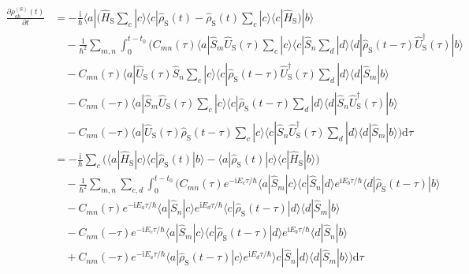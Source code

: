 \documentclass[9pt]{report}
\begin{document}
\begin{align}
\frac{\partial\rho_{ab}^{(\mathrm{S})}(t)}{\partial t} &= -\frac{\mathrm{i}}{\hbar}\langle a|\Big(\hat{H}_{\mathrm{S}}\sum_{c}|c\rangle\langle c|\hat{\rho}_{\mathrm{S}}(t)-\hat{\rho}_{\mathrm{S}}(t)\sum_{c}|c\rangle\langle c|\hat{H}_{\mathrm{S}}\Big)|b\rangle\\
&\quad-\frac{1}{\hbar^2}\sum_{m,n}\int_{0}^{t-t_0}\Big(C_{mn}(\tau)\langle a|\hat{S}_{m}\hat{U}_{\mathrm{S}}(\tau)\sum_{c}|c\rangle\langle c|\hat{S}_{n}\sum_{d}|d\rangle\langle d|\hat{\rho}_{\mathrm{S}}(t-\tau)\hat{U}_{\mathrm{S}}^{\dagger}(\tau)|b\rangle\\
&\quad-C_{mn}(\tau)\langle a|\hat{U}_{\mathrm{S}}(\tau)\hat{S}_{n}\sum_{c}|c\rangle\langle c|\hat{\rho}_{\mathrm{S}}(t-\tau)\hat{U}_{\mathrm{S}}^{\dagger}(\tau)\sum_{d}|d\rangle\langle d|\hat{S}_{m}|b\rangle\\
&\quad-C_{nm}(-\tau)\langle a|\hat{S}_{m}\hat{U}_{\mathrm{S}}(\tau)\sum_{c}|c\rangle\langle c|\hat{\rho}_{\mathrm{S}}(t-\tau)\sum_{d}|d\rangle\langle d|\hat{S}_{n}\hat{U}_{\mathrm{S}}^{\dagger}(\tau)|b\rangle\\
&\quad-C_{nm}(-\tau)\langle a|\hat{U}_{\mathrm{S}}(\tau)\hat{\rho}_{\mathrm{S}}(t-\tau)\sum_{c}|c\rangle\langle c|\hat{S}_{n}\hat{U}_{\mathrm{S}}^{\dagger}(\tau)\sum_{d}|d\rangle\langle d|\hat{S}_{m}|b\rangle\Big)\mathrm{d}\tau\\
&= -\frac{\mathrm{i}}{\hbar}\sum_{c}\Big(\langle a|\hat{H}_{\mathrm{S}}|c\rangle\langle c|\hat{\rho}_{\mathrm{S}}(t)|b\rangle - \langle a|\hat{\rho}_{\mathrm{S}}(t)|c\rangle\langle c|\hat{H}_{\mathrm{S}}|b\rangle\Big)\\
&\quad-\frac{1}{\hbar^2}\sum_{m,n}\sum_{c,d}\int_{0}^{t-t_0}\Big(C_{mn}(\tau)e^{-\mathrm{i}E_{c}\tau/\hbar}\langle a|\hat{S}_{m}|c\rangle\langle c|\hat{S}_{n}|d\rangle e^{\mathrm{i}E_{b}\tau/\hbar}\langle d|\hat{\rho}_{\mathrm{S}}(t-\tau)|b\rangle\\
&\quad-C_{mn}(\tau)e^{-\mathrm{i}E_{a}\tau/\hbar}\langle a|\hat{S}_{n}|c\rangle e^{\mathrm{i}E_{d}\tau/\hbar}\langle c|\hat{\rho}_{\mathrm{S}}(t-\tau)| d\rangle\langle d|\hat{S}_{m}|b\rangle\\
&\quad-C_{nm}(-\tau)e^{-\mathrm{i}E_{c}\tau/\hbar}\langle a|\hat{S}_{m}|c\rangle\langle c|\hat{\rho}_{\mathrm{S}}(t-\tau)|d\rangle e^{\mathrm{i}E_{b}\tau/\hbar}\langle d|\hat{S}_{n}|b\rangle\\
&\quad+C_{nm}(-\tau)e^{-\mathrm{i}E_{a}\tau/\hbar}\langle a|\hat{\rho}_{\mathrm{S}}(t-\tau)|c\rangle e^{\mathrm{i}E_{d}\tau/\hbar}\rangle c|\hat{S}_{n}|d\rangle\langle d|\hat{S}_{m}|b\rangle\Big)\mathrm{d}\tau
\end{align}
\end{document}
